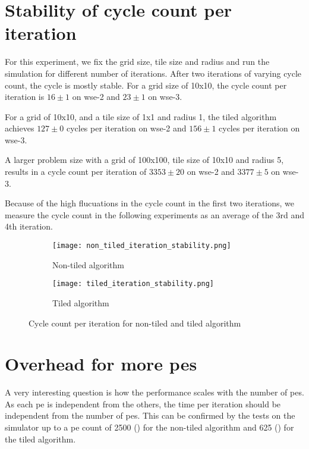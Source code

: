 \section{Stability of cycle count per iteration}
For this experiment, we fix the grid size, tile size and radius and run the simulation for different number of iterations.
After two iterations of varying cycle count, the cycle is mostly stable.
For a grid size of 10x10, the cycle count per iteration is $16\pm1$ on \ac{wse}-2 and $23\pm1$ on \ac{wse}-3.

For a grid of 10x10, and a tile size of 1x1 and radius 1, the tiled algorithm achieves $127\pm0$ cycles per iteration on \ac{wse}-2 and $156\pm1$ cycles per iteration on \ac{wse}-3.

A larger problem size with a grid of 100x100, tile size of 10x10 and radius 5, results in a cycle count per iteration of $3353\pm20$ on \ac{wse}-2 and $3377\pm5$ on \ac{wse}-3.

Because of the high flucuations in the cycle count in the first two iterations, we measure the cycle count in the following experiments as an average of the 3rd and 4th iteration.

\begin{figure}[h]
    \centering
    \begin{subfigure}[b]{0.48\textwidth}
        \centering
        \texttt{[image: non\_tiled\_iteration\_stability.png]}
        \caption{Non-tiled algorithm}
        \label{fig:non_tiled_iteration_stability}
    \end{subfigure}
    \hfill
    \begin{subfigure}[b]{0.48\textwidth}
        \centering
        \texttt{[image: tiled\_iteration\_stability.png]}
        \caption{Tiled algorithm}
        \label{fig:tiled_iteration_stability}
    \end{subfigure}
    \caption{Cycle count per iteration for non-tiled and tiled algorithm}
    \label{fig:iteration_stability}
\end{figure}



\section{Overhead for more \acp{pe}}
\label{sec:pe_overhead}
A very interesting question is how the performance scales with the number of \acp{pe}.
As each \ac{pe} is independent from the others, the time per iteration should be independent from the number of \acp{pe}.
This can be confirmed by the tests on the simulator up to a \ac{pe} count of \num{2500} () for the non-tiled algorithm and \num{625} () for the tiled algorithm.

